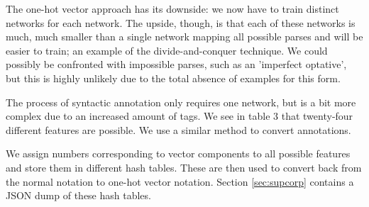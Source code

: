 

The one-hot vector approach has its downside: we now have to train
distinct networks for each network. The upside, though, is that each
of these networks is much, much smaller than a single network mapping
all possible parses and will be easier to train; an example of the
divide-and-conquer technique. We could possibly be confronted with
impossible parses, such as an 'imperfect optative', but this is highly
unlikely due to the total absence of examples for this form.

The process of syntactic annotation only requires one network, but is
a bit more complex due to an increased amount of tags.  We see in
table 3 that twenty-four different features are possible. We use a
similar method to convert annotations.

We assign numbers corresponding to vector components to all possible
features and store them in different hash tables. These are then used
to convert back from the normal notation to one-hot vector
notation. Section \ref{sec:supcorp} contains a JSON dump of these hash
tables.





